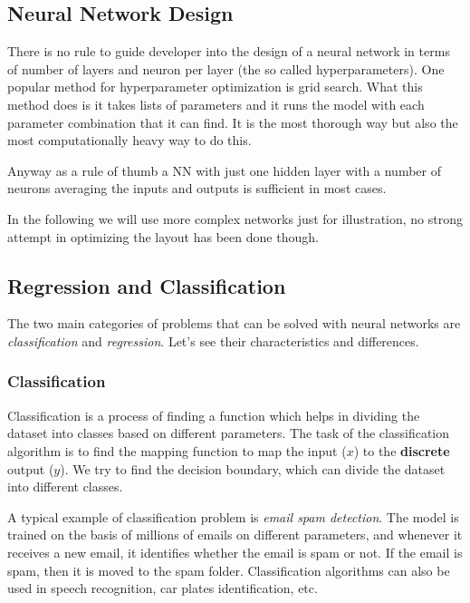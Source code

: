 \subsection{Neural Network Design}\label{neural-network-design}

There is no rule to guide developer into the design of a neural network
in terms of number of layers and neuron per layer (the so called hyperparameters). 
One popular method for hyperparameter optimization is grid search. What this method does is it takes lists of parameters and it runs the model with each parameter combination that it can find. It is the most thorough way but also the most computationally heavy way to do this.

Anyway as a rule of thumb a NN with just one hidden layer with a number
of neurons averaging the inputs and outputs is sufficient in most cases.

In the following we will use more complex networks just for
illustration, no strong attempt in optimizing the layout has been done
though.

\subsection{Regression and Classification}\label{regression-and-classification}

The two main categories of problems that can be solved with neural
networks are \emph{classification} and \emph{regression}. Let's see
their characteristics and differences.

\subsubsection{Classification}\label{classification}

Classification is a process of finding a function which helps in dividing
the dataset into classes based on different parameters. 
The task of the classification algorithm is to find the mapping function
to map the input (\(x\)) to the \textbf{discrete} output (\(y\)). We try
to find the decision boundary, which can divide the dataset into
different classes.

A typical example of classification problem is
\emph{email spam detection}. The model is trained on the basis of millions of
emails on different parameters, and whenever it receives a new email, it
identifies whether the email is spam or not. If the email is spam, then
it is moved to the spam folder. Classification algorithms can also be used in
speech recognition, car plates identification, etc.

